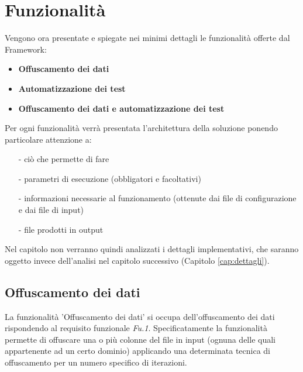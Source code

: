 \newpage
\section{Funzionalità}
\label{sect:funz}
Vengono ora presentate e spiegate nei minimi dettagli le funzionalità offerte dal Framework:
\begin{itemize}[nosep]
\item \textbf{Offuscamento dei dati}
\item \textbf{Automatizzazione dei test}  
\item \textbf{Offuscamento dei dati e automatizzazione dei test} 
\end{itemize}
\smallskip
\noindent Per ogni funzionalità verrà presentata l'architettura della soluzione ponendo particolare attenzione a:
\begin{itemize}[nosep]
\item[-]  ciò che permette di fare
\item[-]  parametri di esecuzione (obbligatori e facoltativi)
\item[-]  informazioni necessarie al funzionamento (ottenute dai file di configurazione e dai file di input)
\item[-] file prodotti in output
\end{itemize}
\bigskip
\noindent  Nel capitolo non verranno quindi analizzati i dettagli implementativi, che saranno oggetto invece dell'analisi nel capitolo successivo (Capitolo \ref{cap:dettagli}).

\newpage

\subsection{Offuscamento dei dati}
La funzionalità 'Offuscamento dei dati' si occupa dell'offuscamento dei dati rispondendo al requisito funzionale \emph{Fu.1}. Specificatamente la funzionalità permette di offuscare una o più colonne del file in input (ognuna delle quali appartenente ad un certo dominio) applicando una determinata tecnica di offuscamento per un numero specifico di iterazioni. 

